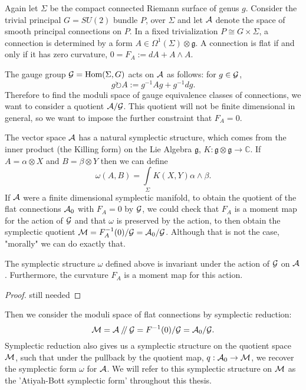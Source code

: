 	 Again let $\Sigma$ be the compact connected Riemann surface of genus $g$. Consider the trivial principal $G=SU(2)$ bundle $P$, over $\Sigma$ and let $\mathcal{A}$ denote the space of smooth principal connections on $P$. In a fixed trivialization $P \cong G\times \Sigma$, a connection is determined by a form $A \in \Omega^1(\Sigma)\otimes \mathfrak{g}$. A connection is flat if and only if it has zero curvature, $0 = F_A:= dA + A \wedge A$. 
	 
	 The gauge group $\mathcal{G} = \text{Hom}(\Sigma, G)$ acts on $\mathcal{A}$ as follows: for $g\in \mathcal{G}$,
	 \begin{equation}
	 g\circlearrowright A := g^{-1}Ag + g^{-1}dg.
	 \end{equation}
	 Therefore to find the moduli space of gauge equivalence classes of connections, we want to consider a quotient $\mathcal{A}/\mathcal{G}$. This quotient will not be finite dimensional in general, so we want to impose the further constraint that $F_A = 0$. 
	
	The vector space $\mathcal{A}$ has a natural symplectic structure, which comes from the inner product (the Killing form) on the Lie Algebra $\mathfrak{g}$, $K:\mathfrak{g}\otimes\mathfrak{g}\to\mathbb{C}$. If $A = \alpha \otimes X$ and $B = \beta \otimes Y$ then we can define
	\begin{equation}
	\omega(A,B) = \int\limits_\Sigma K(X,Y)\alpha\wedge \beta.
	\end{equation}
	If $\mathcal{A}$ were a finite dimensional symplectic manifold, to obtain the quotient of the flat connections $\mathcal{A}_0$ with $F_A =0$ by $\mathcal{G}$, we could check that $F_A$ is a moment map for the action of $\mathcal{G}$ and that $\omega$ is preserved by the action, to then obtain the symplectic quotient $\mathcal{M} = F_A^{-1}(0)/\mathcal{G} = \mathcal{A}_0/\mathcal{G}$. Although that is not the case, "morally" we can do exactly that.
	\begin{theorem}
		The symplectic structure $\omega$ defined above is invariant under the action of $\mathcal{G}$ on $\mathcal{A}$. Furthermore, the curvature $F_A$ is a moment map for this action.
	\end{theorem}
	\begin{proof}
	still needed
	\end{proof}
	Then we consider the moduli space of flat connections by symplectic reduction:
	\begin{equation}
	\mathcal{M} = \mathcal{A}\mathbin{/\mkern-4mu/}\mathcal{G} = F^{-1}(0)/ \mathcal{G}= \mathcal{A}_0/ \mathcal{G}.
	\end{equation} 
	Symplectic reduction also gives us a symplectic structure on the quotient space $\mathcal{M}$, such that under the pullback by the quotient map, $q:\mathcal{A}_0 \to \mathcal{M}$, we recover the symplectic form $\omega$ for $\mathcal{A}$. We will refer to this symplectic structure on $\mathcal{M}$ as the 'Atiyah-Bott symplectic form' throughout this thesis.

